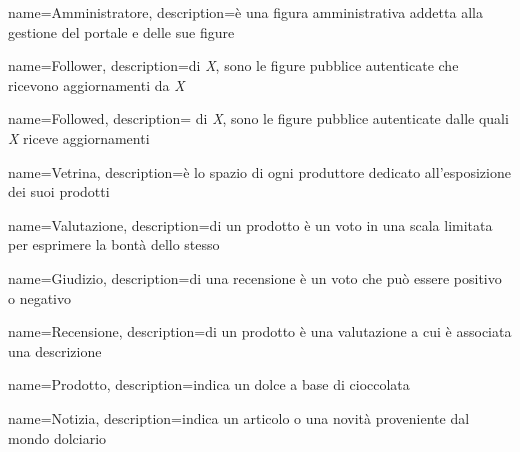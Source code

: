 {
    name={Amministratore},
    description={è una figura amministrativa addetta alla gestione del portale e delle sue figure}
}

{
    name={Follower},
    description={di \emph{X}, sono le figure pubblice autenticate che ricevono aggiornamenti da \emph{X}}
}

{
    name={Followed},
    description={ di \emph{X}, sono le figure pubblice autenticate dalle quali \emph{X} riceve aggiornamenti}
}

{
    name={Vetrina},
    description={è lo spazio di ogni produttore dedicato all'esposizione dei suoi prodotti}
}

{
    name={Valutazione},
    description={di un prodotto è un voto in una scala limitata per esprimere la bontà dello stesso}
}

{
    name={Giudizio},
    description={di una recensione è un voto che può essere positivo o negativo}
}

{
    name={Recensione},
    description={di un prodotto è una valutazione a cui è associata una descrizione}
}

{
    name={Prodotto},
    description={indica un dolce a base di cioccolata}
}

{
    name={Notizia},
    description={indica un articolo o una novità proveniente dal mondo dolciario}
}


